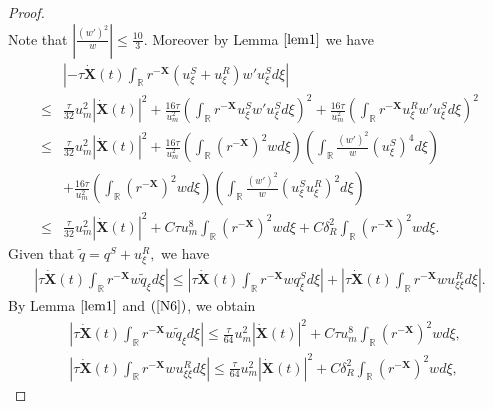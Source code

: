 \documentclass[10pt,reqno]{amsart}
\numberwithin{equation}{section}
\begin{document}
\begin{proof}
\begin{equation}
		\end{equation}
		Note that $\left|\frac{(w')^2}{w}\right|\leq \frac{10}{3}$. Moreover by Lemma $\ref{lem1}$ we have
		\begin{equation}\label{N7}
			\begin{aligned}
				&\left|-\tau\dot{\mathbf{X}}(t) \int_{\mathbb{R}}r^{-\mathbf{X}}\left(u_{\xi}^{S}+u_{\xi}^{R}\right)w'u_{\xi}^{S}d\xi\right|\\
				\leq&\frac{\tau}{32}u_m^2\left|\dot{\mathbf{X}}(t)\right|^2+\frac{16\tau}{u_m^2}\left(\int_{\mathbb{R}}r^{-\mathbf{X}}u_{\xi}^{S}w'u_{\xi}^{S}d\xi\right)^2+\frac{16\tau}{u_m^2}\left(\int_{\mathbb{R}}r^{-\mathbf{X}}u_{\xi}^{R}w'u_{\xi}^{S}d\xi\right)^2\\
				\leq&\frac{\tau}{32}u_m^2\left|\dot{\mathbf{X}}(t)\right|^2+\frac{16\tau}{u_m^2}\left(\int_{\mathbb{R}}(r^{-\mathbf{X}})^2wd\xi\right)\left(\int_{\mathbb{R}}\frac{(w')^2}{w}(u_{\xi}^S)^4d\xi\right)\\
				&+\frac{16\tau}{u_m^2}\left(\int_{\mathbb{R}}(r^{-\mathbf{X}})^2wd\xi\right)\left(\int_{\mathbb{R}}\frac{(w')^2}{w}(u_{\xi}^Su_{\xi}^R)^2d\xi\right)\\
				\leq&\frac{\tau}{32}u_m^2\left|\dot{\mathbf{X}}(t)\right|^2+C\tau u_m^8\int_{\mathbb{R}}(r^{-\mathbf{X}})^2wd\xi+C\delta_R^2\int_{\mathbb{R}}(r^{-\mathbf{X}})^2wd\xi.
			\end{aligned}
		\end{equation}
		Given that $\tilde{q}=q^S+u_{\xi}^R,$ we have
		\begin{equation}\label{N81}
			\begin{aligned}
				\left|\tau\dot{\mathbf{X}}(t)\int_{\mathbb{R}}r^{-\mathbf{X}}w\tilde{q}_{\xi}d\xi\right|\leq \left|\tau\dot{\mathbf{X}}(t)\int_{\mathbb{R}}r^{-\mathbf{X}}wq_{\xi}^Sd\xi\right|+\left|\tau\dot{\mathbf{X}}(t)\int_{\mathbb{R}}r^{-\mathbf{X}}wu_{\xi\xi}^Rd\xi\right|.
			\end{aligned}
		\end{equation}
		By Lemma $\ref{lem1}$ and $(\ref{N6})$, we obtain
		\begin{equation}\label{N82}
			\begin{aligned}
				&\left|\tau\dot{\mathbf{X}}(t)\int_{\mathbb{R}}r^{-\mathbf{X}}w\tilde{q}_{\xi}d\xi\right|\leq\frac{\tau}{64}u_m^2\left|\dot{\mathbf{X}}(t)\right|^2+C\tau u_m^8\int_{\mathbb{R}}(r^{-\mathbf{X}})^2wd\xi,\\
				&\left|\tau\dot{\mathbf{X}}(t)\int_{\mathbb{R}}r^{-\mathbf{X}}wu_{\xi\xi}^Rd\xi\right|\leq\frac{\tau}{64}u_m^2\left|\dot{\mathbf{X}}(t)\right|^2+C\delta_R^2\int_{\mathbb{R}}(r^{-\mathbf{X}})^2wd\xi,

\end{aligned}
\end{equation}
\end{proof}
\end{document}
